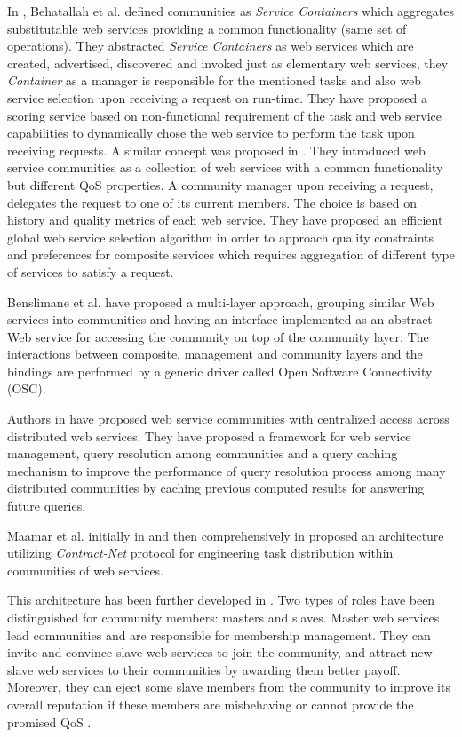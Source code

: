 \documentclass[10pt,journal,cspaper,compsoc]{IEEEtran}
\begin{document}
In \cite{DBLP:journals/internet/BenatallahSD03}, Behatallah et al. defined communities as \emph{Service Containers} which aggregates substitutable web services providing a common functionality (same set of operations). They abstracted \emph{Service Containers} as web services which are created, advertised, discovered and invoked just as elementary web services, they \emph{Container} as a manager is responsible for the mentioned tasks and also web service selection upon receiving a request on run-time. They have proposed a scoring service based on non-functional requirement of the task and web service capabilities to dynamically chose the web service to perform the task upon receiving requests. A similar concept was proposed in \cite{DBLP:journals/ijebr/MaamarSTBB09}. They introduced web service communities as a collection of web services with a common functionality but different QoS properties. A community manager upon receiving a request, delegates the request to one of its current members. The choice is based on history and quality metrics of each web service. They have proposed an efficient global web service selection algorithm in order to approach quality constraints and preferences for composite services which requires aggregation of different type of services to satisfy a request.

Benslimane et al. \cite{Liris-2770} have proposed a multi-layer approach, grouping similar Web services into communities and having an interface implemented as an abstract Web service for accessing the community on top of the community layer. The interactions between composite, management and community layers and the bindings are performed by a generic driver called Open Software Connectivity (OSC).

Authors in \cite{managing-hela-jalel} have proposed web service communities with centralized access across distributed web services. They have proposed a framework for web service management, query resolution among communities and a query caching mechanism to improve the performance of query resolution process among many distributed communities by caching previous computed results for answering future queries.


Maamar et al. initially in \cite{conf/webist/MaamarLBTS07} and
then comprehensively in \cite{DBLP:journals/ijebr/MaamarSTBB09}
proposed an architecture utilizing \emph{Contract-Net} protocol
for engineering task distribution within communities of web services. 

This architecture has been further developed in
\cite{conf/IEEEscc/BenharrefSBB11, conf/IEEEscc/KhosravifarBMMT10,
conf/aina/LimTM11, CSTintercommunity}. Two types of roles have
been distinguished for community members: masters and slaves.
Master web services lead communities and are responsible for
membership management. They can invite and convince slave web
services to join the community, and attract new slave web services
to their communities by awarding them better payoff. Moreover,
they can eject some slave members from the community to improve
its overall reputation if these members are misbehaving or cannot
provide the promised QoS \cite{DBLP:journals/ijebr/MaamarSTBB09}.
\end{document}
